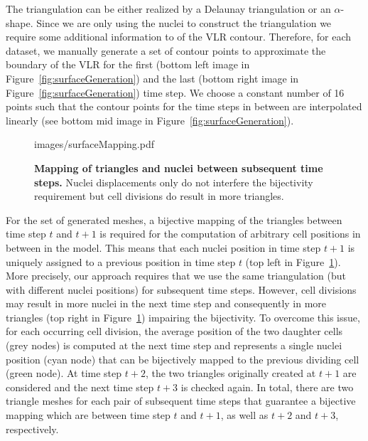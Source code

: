 \documentclass[11pt,a4paper, final]{article}
\begin{document}
The triangulation can be either realized by a Delaunay triangulation or an $\alpha$-shape. Since we are only using the nuclei to construct the triangulation we require some additional information to of the VLR contour. Therefore, for each dataset, we manually generate a set of contour points to approximate the boundary of the VLR for the first (bottom left image in Figure~\ref{fig:surfaceGeneration}) and the last (bottom right image in Figure~\ref{fig:surfaceGeneration}) time step. We choose a constant number of 16 points such that the contour points for the time steps in between are interpolated linearly (see bottom mid image in Figure~\ref{fig:surfaceGeneration}).
%
\begin{figure}[htbp]
	\begin{center}
		\begin{overpic}[width=0.8\linewidth]{images/surfaceMapping.pdf}
		\end{overpic}
\caption[Mapping of triangles and nuclei between subsequent time steps.]
{
{\bf Mapping of triangles and nuclei between subsequent time steps.} Nuclei displacements only do not interfere the bijectivity requirement but cell divisions do result in more triangles.
}
	\label{fig:surfaceMapping}
	\end{center}
\end{figure}
%

For the set of generated meshes, a bijective mapping of the triangles between time step $t$ and $t+1$ is required for the computation of arbitrary cell positions in between in the model. This means that each nuclei position in time step $t+1$ is uniquely assigned to a previous position in time step $t$ (top left in Figure~\ref{fig:surfaceMapping}). More precisely, our approach requires that we use the same triangulation (but with different nuclei positions) for subsequent time steps. However, cell divisions may result in more nuclei in the next time step and consequently in more triangles (top right in Figure~\ref{fig:surfaceMapping}) impairing the bijectivity. To overcome this issue, for each occurring cell division, the average position of the two daughter cells (grey nodes) is computed at the next time step and represents a single nuclei position (cyan node) that can be bijectively mapped to the previous dividing cell (green node). At time step $t+2$, the two triangles originally created at $t+1$ are considered and the next time step $t+3$ is checked again. In total, there are two triangle meshes for each pair of subsequent time steps that guarantee a bijective mapping which are between time step $t$ and $t+1$, as well as $t+2$ and $t+3$, respectively.
\end{document}
